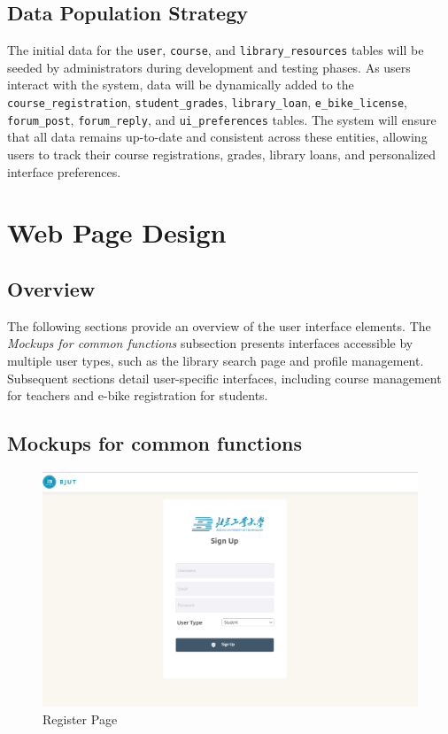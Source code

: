 \documentclass[12pt]{article}
\begin{document}
\subsection{Data Population Strategy}
The initial data for the \texttt{user}, \texttt{course}, and \texttt{library\_resources} 
tables will be seeded by administrators during development and testing phases. As users 
interact with the system, data will be dynamically added to the \texttt{course\_registration}, 
\texttt{student\_grades}, \texttt{library\_loan}, \texttt{e\_bike\_license}, \texttt{forum\_post}, 
\texttt{forum\_reply}, and \texttt{ui\_preferences} tables. The system will ensure that all data 
remains up-to-date and consistent across these entities, allowing users to track their course 
registrations, grades, library loans, and personalized interface preferences.

\newpage
\section{Web Page Design}
\subsection{Overview}

The following sections provide an overview of the user interface elements. The \textit{Mockups for common functions} subsection presents interfaces accessible by multiple user types, such as the library search page and profile management. Subsequent sections detail user-specific interfaces, including course management for teachers and e-bike registration for students.

\subsection{Mockups for common functions}

\begin{figure}[H]
    \centering
    \includegraphics[width=\textwidth]{mockups/common/register.png}
    \caption{Register Page}
    \label{fig:register_page}
\end{figure}
\end{document}

